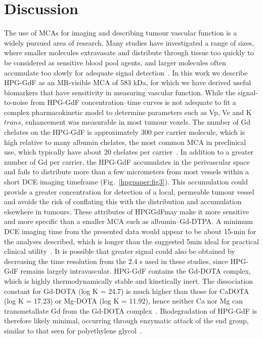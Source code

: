 \section{Discussion}

The use of MCAs for imaging and describing tumour vascular function is a widely pursued area of research.
Many studies have investigated a range of sizes, where smaller molecules extravasate and distribute through tissue too quickly to be considered as sensitive blood pool agents, and larger molecules often accumulate too slowly for adequate signal detection~\cite{Kyle:2007ch,Tang:2013fi,Sourbron:2011ce}.
In this work we describe HPG-GdF as an MR-visible MCA of 583 kDa, for which we have derived useful biomarkers that have sensitivity in measuring vascular function.
While the signal-to-noise from HPG-GdF concentration–time curves is not adequate to fit a complex pharmacokinetic model to determine parameters such as Vp, Ve and K${trans}$, enhancement was measurable in most tumour voxels.
The number of Gd chelates on the HPG-GdF is approximately 300 per carrier molecule, which is high relative to many albumin chelates, the most common MCA in preclinical use, which typically have about 20 chelates per carrier~\cite{Ogan:1987tg}.
In addition to a greater number of Gd per carrier, the HPG-GdF accumulates in the perivascular space and fails to distribute more than a few micrometers from most vessels within a short DCE imaging timeframe (Fig.~\ref{hpgpaper:fig3}).
This accumulation could provide a greater concentration for detection of a local, permeable tumour vessel and avoids the risk of conflating this with the distribution and accumulation elsewhere in tumours.
These attributes of HPGGdFmay make it more sensitive and more specific than a smaller MCA such as albumin–Gd-DTPA.
A minimum DCE imaging time from the presented data would appear to be about 15-min for the analyses described, which is longer than the suggested 5min ideal for practical clinical utility~\cite{Turetschek:2004bw}.
It is possible that greater signal could also be obtained by decreasing the time resolution from the 2.4 s used in these studies, since HPG-GdF remains largely intravascular.
HPG-GdF contains the Gd-DOTA complex, which is highly thermodynamically stable and kinetically inert.
The dissociation constant for Gd-DOTA (log K = 24.7) is much higher than those for CaDOTA (log K = 17.23) or Mg-DOTA (log K = 11.92), hence neither Ca nor Mg can transmetallate Gd from the Gd-DOTA complex~\cite{Baranyai:2005ta}.
Biodegradation of HPG-GdF is therefore likely minimal, occurring through enzymatic attack of the end group, similar to that seen for polyethylene glycol~\cite{Kawai:2002fc}.
